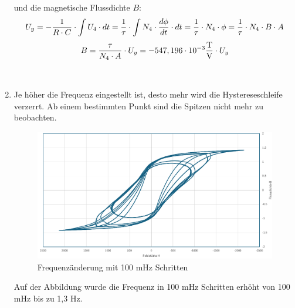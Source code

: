 \documentclass[a4paper,twoside,12pt,DIV=13,BCOR=5mm,numbers=noenddot,cleardoublepage=empty]{scrbook}
\begin{document}
\begin{enumerate}
                und die magnetische Flussdichte $B$:
                \begin{equation}
                    U_y = -\frac{1}{R \cdot C} \cdot \int U_4 \cdot dt \\
                    = \frac{1}{\tau} \cdot \int N_4 \cdot \frac{d\phi}{dt} \cdot dt \\
                    = \frac{1}{\tau} \cdot N_4 \cdot \phi \\
                    = \frac{1}{\tau} \cdot N_4 \cdot B \cdot A \\
                \end{equation}
                \begin{equation}
                    B = \frac{\tau}{N_4 \cdot A} \cdot U_y \\
                    = -547,196 \cdot 10^{-3} \frac{\text{T}}{\text{V}} \cdot U_y
                \end{equation}

            \\

            \newpage

            \item Je höher die Frequenz eingestellt ist, desto mehr wird die Hystereseschleife verzerrt. Ab einem bestimmten Punkt sind die Spitzen nicht mehr zu beobachten.

            \begin{figure}[h] 
            \centering
            \includegraphics[width=\textwidth]{pictures/freqAnderung.png} 
            \caption{Frequenzänderung mit 100 mHz Schritten}
            \label{fig:meinbild}
            \end{figure}

            Auf der Abbildung wurde die Frequenz in 100 mHz Schritten erhöht von 100 mHz bis zu 1,3 Hz.
            

\end{enumerate}
\end{document}
